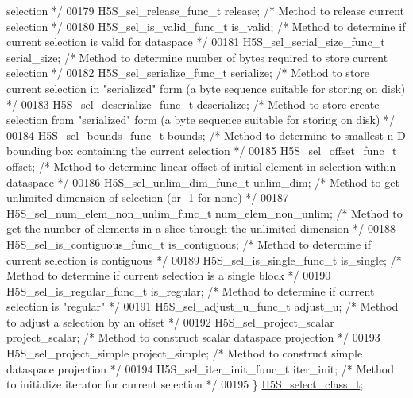 \begin{DoxyCode}
{       selection */}
00179     H5S\_sel\_release\_func\_t release;             \textcolor{comment}{/* Method to release current selection */}
00180     H5S\_sel\_is\_valid\_func\_t is\_valid;           \textcolor{comment}{/* Method to determine if current selection is valid for
       dataspace */}
00181     H5S\_sel\_serial\_size\_func\_t serial\_size;     \textcolor{comment}{/* Method to determine number of bytes required to store
       current selection */}
00182     H5S\_sel\_serialize\_func\_t serialize;         \textcolor{comment}{/* Method to store current selection in "serialized" form
       (a byte sequence suitable for storing on disk) */}
00183     H5S\_sel\_deserialize\_func\_t deserialize;     \textcolor{comment}{/* Method to store create selection from "serialized" form
       (a byte sequence suitable for storing on disk) */}
00184     H5S\_sel\_bounds\_func\_t bounds;               \textcolor{comment}{/* Method to determine to smallest n-D bounding box
       containing the current selection */}
00185     H5S\_sel\_offset\_func\_t offset;               \textcolor{comment}{/* Method to determine linear offset of initial element in
       selection within dataspace */}
00186     H5S\_sel\_unlim\_dim\_func\_t unlim\_dim;              \textcolor{comment}{/* Method to get unlimited dimension of selection (or
       -1 for none) */}
00187     H5S\_sel\_num\_elem\_non\_unlim\_func\_t num\_elem\_non\_unlim; \textcolor{comment}{/* Method to get the number of elements in a
       slice through the unlimited dimension */}
00188     H5S\_sel\_is\_contiguous\_func\_t is\_contiguous; \textcolor{comment}{/* Method to determine if current selection is contiguous 
      */}
00189     H5S\_sel\_is\_single\_func\_t is\_single;         \textcolor{comment}{/* Method to determine if current selection is a single
       block */}
00190     H5S\_sel\_is\_regular\_func\_t is\_regular;       \textcolor{comment}{/* Method to determine if current selection is "regular" */}
00191     H5S\_sel\_adjust\_u\_func\_t adjust\_u;           \textcolor{comment}{/* Method to adjust a selection by an offset */}
00192     H5S\_sel\_project\_scalar project\_scalar;      \textcolor{comment}{/* Method to construct scalar dataspace projection */}
00193     H5S\_sel\_project\_simple project\_simple;      \textcolor{comment}{/* Method to construct simple dataspace projection */}
00194     H5S\_sel\_iter\_init\_func\_t iter\_init;         \textcolor{comment}{/* Method to initialize iterator for current selection */}
00195 \} \hyperlink{struct_h5_s__select__class__t}{H5S\_select\_class\_t};

\end{DoxyCode}
